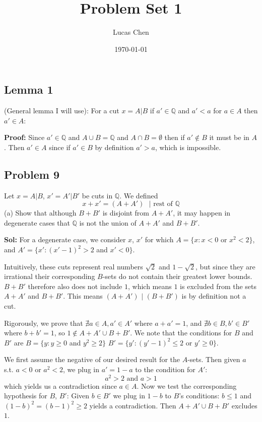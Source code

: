 \documentclass{amsart}
\title{Problem Set 1}
\author{Lucas Chen}
\date{\today}
\begin{document}
\maketitle


\subsection*{Lemma 1} (General lemma I will use): For a cut $x=A|B$ if $a'\in\mathbb{Q}$ and $a'<a$ for $a\in A$ then $a'\in A$:

\medskip
\noindent \textbf{Proof:} Since $a'\in\mathbb{Q}$ and $A\cup B=\mathbb{Q}$ and $A\cap B=\emptyset$ then if $a'\notin B$ it must be in
$A$. Then $a'\in A$ since if $a'\in B$ by definition $a'>a$, which is impossible.

\subsection*{Problem 9}
\noindent Let $x = A|B$, $x' = A'|B'$ be cuts in $\mathbb{Q}$. We defined $$x+x'=(A+A') \text{ }| \text{ rest of }\mathbb{Q}$$
\indent (a) Show that although $B + B'$ is disjoint from $A + A'$, 
it may happen in degenerate cases that $\mathbb{Q}$ is not the union of $A + A'$ and $B + B'$.

\medskip
\noindent \textbf{Sol:} For a degenerate case, we consider $x$, $x'$ for which $A = \{x: x<0$ or $x^2<2\}$, and 
$A' = \{x' : (x'-1)^2>2$ and $x'<0\}$. 

\medskip
\noindent Intuitively, these cuts represent real numbers $\sqrt{2}$ and $1-\sqrt{2}$, 
but since they are irrational their corresponding $B$-sets do not contain their greatest lower bounds. $B+B'$
therefore also does not include $1$, which means $1$ is excluded from the sets $A+A'$ and $B+B'$. This means $(A+A')$ $|$ $(B+B')$
is by definition not a cut.

\medskip
\noindent Rigorously, we prove that $\nexists a\in A, a'\in A'$ where $a+a'=1$, and $\nexists b\in B, b'\in B'$ where $b+b'=1$, 
so $1\notin A+A' \cup B+B'$. We note that the conditions for $B$ and $B'$ are $B= \{y: y\geq 0$ and $y^2\geq 2\}$ 
$B'= \{y' : (y'-1)^2\leq2$ or $y'\geq0\}$.

\medskip
\noindent We first assume the negative of our desired result for the $A$-sets. Then given $a$ s.t. $a<0$ or $a^2<2$, we plug in
$a'=1-a$ to the condition for $A'$: $$a^2>2 \text{ and } a>1$$ which yields us a contradiction since $a\in A$. Now we test the 
corresponding hypothesis for $B$, $B'$: Given $b\in B'$ we plug in $1-b$ to $B$'s conditions: $b\leq 1$ and $(1-b)^2=(b-1)^2\geq 2$
yields a contradiction. Then $A+A'\cup B+B'$ excludes $1$.
\end{document}
